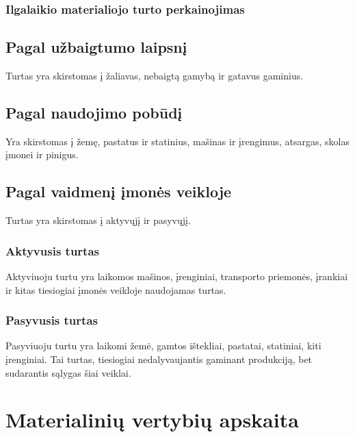
\subsubsection{Ilgalaikio materialiojo turto perkainojimas}


\subsection{Pagal užbaigtumo laipsnį}


Turtas yra skirstomas į žaliavas, nebaigtą gamybą ir gatavus gaminius.

\subsection{Pagal naudojimo pobūdį}


Yra skirstomas į žemę, pastatus ir statinius, mašinas ir įrengimus,
atsargas, skolas įmonei ir pinigus.

\subsection{Pagal vaidmenį įmonės veikloje}


Turtas yra skirstomas į aktyvųjį ir pasyvųjį.

\subsubsection{Aktyvusis turtas}


Aktyviuoju turtu yra laikomos mašinos, įrenginiai, transporto priemonės,
įrankiai ir kitas tiesiogiai įmonės veikloje naudojamas turtas.

\subsubsection{Pasyvusis turtas}


Pasyviuoju turtu yra laikomi žemė, gamtos ištekliai, pastatai, statiniai,
kiti įrenginiai. Tai turtas, tiesiogiai nedalyvaujantis gaminant
produkciją, bet sudarantis sąlygas šiai veiklai.

\section{Materialinių vertybių apskaita}

